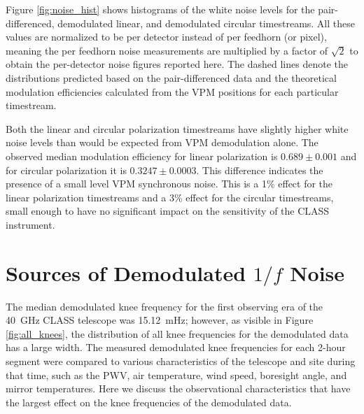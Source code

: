 \documentclass[twocolumn, tighten, numberedappendix, twocolappendix]{aastex63}
\begin{document}
Figure \ref{fig:noise_hist} shows histograms of the white noise levels for the pair-differenced, demodulated linear, and demodulated circular timestreams. All these values are normalized to be per detector instead of per feedhorn (or pixel), meaning the per feedhorn noise measurements are multiplied by a factor of $\sqrt{2}$ to obtain the per-detector noise figures reported here. The dashed lines denote the distributions predicted based on the pair-differenced data and the theoretical modulation efficiencies calculated from the VPM positions for each particular timestream. 

Both the linear and circular polarization timestreams have slightly higher white noise levels than would be expected from VPM demodulation alone. The observed median modulation efficiency for linear polarization is $0.689\pm0.001$ and for circular polarization it is $0.3247\pm0.0003$. This difference indicates the presence of a small level VPM synchronous noise. This is a 1\% effect for the linear polarization timestreams and a 3\% effect for the circular timestreams, small enough to have no significant impact on the sensitivity of the CLASS instrument.







\section{\label{sec:obs}Sources of Demodulated \lowercase{$1/f$} Noise}

The median demodulated knee frequency for the first observing era of the 40~GHz CLASS telescope was 15.12~mHz; however, as visible in Figure \ref{fig:all_knees}, the distribution of all knee frequencies for the demodulated data has a large width. The measured demodulated knee frequencies for each 2-hour segment were compared to various characteristics of the telescope and site during that time, such as the PWV, air temperature, wind speed, boresight angle, and mirror temperatures. Here we discuss the observational characteristics that have the largest effect on the knee frequencies of the demodulated data.
\end{document}
